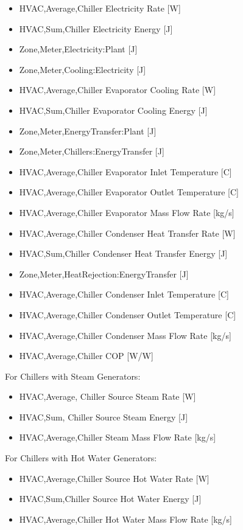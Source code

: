\begin{itemize}
\item
  HVAC,Average,Chiller Electricity Rate {[}W{]}
\item
  HVAC,Sum,Chiller Electricity Energy {[}J{]}
\item
  Zone,Meter,Electricity:Plant {[}J{]}
\item
  Zone,Meter,Cooling:Electricity {[}J{]}
\item
  HVAC,Average,Chiller Evaporator Cooling Rate {[}W{]}
\item
  HVAC,Sum,Chiller Evaporator Cooling Energy {[}J{]}
\item
  Zone,Meter,EnergyTransfer:Plant {[}J{]}
\item
  Zone,Meter,Chillers:EnergyTransfer {[}J{]}
\item
  HVAC,Average,Chiller Evaporator Inlet Temperature {[}C{]}
\item
  HVAC,Average,Chiller Evaporator Outlet Temperature {[}C{]}
\item
  HVAC,Average,Chiller Evaporator Mass Flow Rate {[}kg/s{]}
\item
  HVAC,Average,Chiller Condenser Heat Transfer Rate {[}W{]}
\item
  HVAC,Sum,Chiller Condenser Heat Transfer Energy {[}J{]}
\item
  Zone,Meter,HeatRejection:EnergyTransfer {[}J{]}
\item
  HVAC,Average,Chiller Condenser Inlet Temperature {[}C{]}
\item
  HVAC,Average,Chiller Condenser Outlet Temperature {[}C{]}
\item
  HVAC,Average,Chiller Condenser Mass Flow Rate {[}kg/s{]}
\item
  HVAC,Average,Chiller COP {[}W/W{]}
\end{itemize}

For Chillers with Steam Generators:

\begin{itemize}
\item
  HVAC,Average, Chiller Source Steam Rate {[}W{]}
\item
  HVAC,Sum, Chiller Source Steam Energy {[}J{]}
\item
  HVAC,Average,Chiller Steam Mass Flow Rate {[}kg/s{]}
\end{itemize}

For Chillers with Hot Water Generators:

\begin{itemize}
\item
  HVAC,Average,Chiller Source Hot Water Rate {[}W{]}
\item
  HVAC,Sum,Chiller Source Hot Water Energy {[}J{]}
\item
  HVAC,Average,Chiller Hot Water Mass Flow Rate {[}kg/s{]}
\end{itemize}

